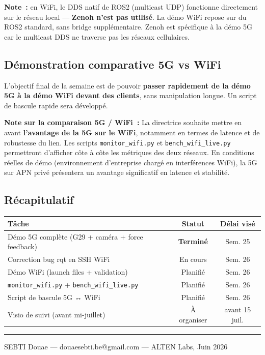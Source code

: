\documentclass[a4paper,11pt]{article}
\begin{document}
\textbf{Note~:} en WiFi, le DDS natif de ROS2 (multicast UDP) fonctionne
directement sur le réseau local — \textbf{Zenoh n'est pas utilisé}. La démo WiFi
repose sur du ROS2 standard, sans bridge supplémentaire. Zenoh est spécifique à la
démo 5G car le multicast DDS ne traverse pas les réseaux cellulaires.

\subsection{Démonstration comparative 5G vs WiFi}

L'objectif final de la semaine est de pouvoir \textbf{passer rapidement de la démo
5G à la démo WiFi devant des clients}, sans manipulation longue. Un script de
bascule rapide sera développé.

\begin{tcolorbox}[colback=lightorange, colframe=warning, left=4pt, right=4pt,
  top=3pt, bottom=3pt]
\textbf{Note sur la comparaison 5G / WiFi~:}
La directrice souhaite mettre en avant \textbf{l'avantage de la 5G sur le WiFi},
notamment en termes de latence et de robustesse du lien. Les scripts
\texttt{monitor\_wifi.py} et \texttt{bench\_wifi\_live.py} permettront d'afficher
côte à côte les métriques des deux réseaux. En conditions réelles de démo
(environnement d'entreprise chargé en interférences WiFi), la 5G sur APN privé
présentera un avantage significatif en latence et stabilité.
\end{tcolorbox}

\subsection{Récapitulatif}

\begin{center}
\begin{tabularx}{\textwidth}{@{}Xcc@{}}
\toprule
\textbf{Tâche} & \textbf{Statut} & \textbf{Délai visé} \\
\midrule
Démo 5G complète (G29 + caméra + force feedback) & \textcolor{success}{\textbf{Terminé}} & Sem. 25 \\
Correction bug rqt en SSH WiFi & En cours & Sem. 26 \\
Démo WiFi (launch files + validation) & Planifié & Sem. 26 \\
\texttt{monitor\_wifi.py} + \texttt{bench\_wifi\_live.py} & Planifié & Sem. 26 \\
Script de bascule 5G ↔ WiFi & Planifié & Sem. 26 \\
Visio de suivi (avant mi-juillet) & À organiser & avant 15 juil. \\
\bottomrule
\end{tabularx}
\end{center}

\vspace{0.6cm}
\hrule
\vspace{0.3cm}
{\small\color{darkgray}
SEBTI Douae — douaesebti.be@gmail.com — ALTEN Labs, Juin 2026
}
\end{document}
